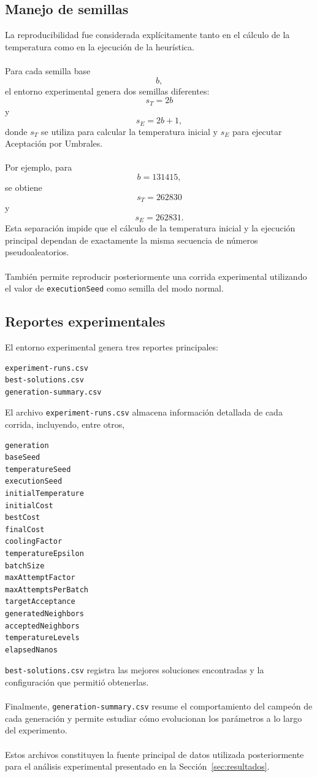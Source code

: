 \documentclass[12pt]{article}
\begin{document}
\subsection{Manejo de semillas}

La reproducibilidad fue considerada explícitamente tanto en el cálculo de
la temperatura como en la ejecución de la heurística.
\\\\
Para cada semilla base
\[
    b,
\]
el entorno experimental genera dos semillas diferentes:
\[
    s_T=2b
\]
y
\[
    s_E=2b+1,
\]
donde \(s_T\) se utiliza para calcular la temperatura inicial y
\(s_E\) para ejecutar Aceptación por Umbrales.
\\\\
Por ejemplo, para
\[
    b=131415,
\]
se obtiene
\[
    s_T=262830
\]
y
\[
    s_E=262831.
\]
Esta separación impide que el cálculo de la temperatura inicial y la
ejecución principal dependan de exactamente la misma secuencia de números
pseudoaleatorios.
\\\\
También permite reproducir posteriormente una corrida experimental
utilizando el valor de \texttt{executionSeed} como semilla del modo normal.

\subsection{Reportes experimentales}

El entorno experimental genera tres reportes principales:
\begin{verbatim}
experiment-runs.csv
best-solutions.csv
generation-summary.csv
\end{verbatim}
El archivo \texttt{experiment-runs.csv} almacena información detallada de
cada corrida, incluyendo, entre otros,
\begin{verbatim}
generation
baseSeed
temperatureSeed
executionSeed
initialTemperature
initialCost
bestCost
finalCost
coolingFactor
temperatureEpsilon
batchSize
maxAttemptFactor
maxAttemptsPerBatch
targetAcceptance
generatedNeighbors
acceptedNeighbors
temperatureLevels
elapsedNanos
\end{verbatim}
\texttt{best-solutions.csv} registra las mejores soluciones encontradas y
la configuración que permitió obtenerlas.
\\\\
Finalmente, \texttt{generation-summary.csv} resume el comportamiento del
campeón de cada generación y permite estudiar cómo evolucionan los
parámetros a lo largo del experimento.
\\\\
Estos archivos constituyen la fuente principal de datos utilizada
posteriormente para el análisis experimental presentado en la
Sección~\ref{sec:resultados}.
\end{document}
